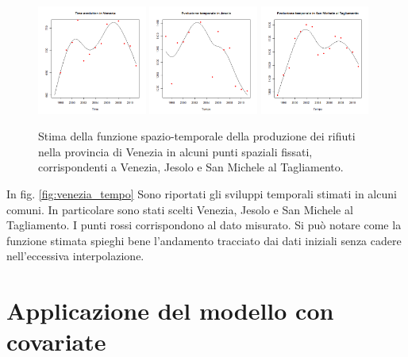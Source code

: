 \documentclass[a4paper,11pt,twoside,openright]{book}							%
\begin{document}
\begin{figure}[H]
\centering
\includegraphics[width=0.32\textwidth]{Immagini/venezia_senza_covariate/Venezia.png}
\includegraphics[width=0.32\textwidth]{Immagini/venezia_senza_covariate/Jesolo.png}
\includegraphics[width=0.32\textwidth]{Immagini/venezia_senza_covariate/SanMichelealTagliamento.png}
\caption{Stima della funzione spazio-temporale della produzione dei rifiuti nella provincia di Venezia in alcuni punti spaziali fissati, corrispondenti a Venezia, Jesolo e San Michele al Tagliamento.}
\label{fig:Ven_tempo}
\end{figure}

In fig. \ref{fig:venezia_tempo} Sono riportati gli sviluppi temporali stimati in alcuni comuni. In particolare sono stati scelti Venezia, Jesolo e San Michele al Tagliamento. I punti rossi corrispondono al dato misurato. Si può notare come la funzione stimata spieghi bene l'andamento tracciato dai dati iniziali senza cadere nell'eccessiva interpolazione.

\section{Applicazione del modello con covariate}
\end{document}

